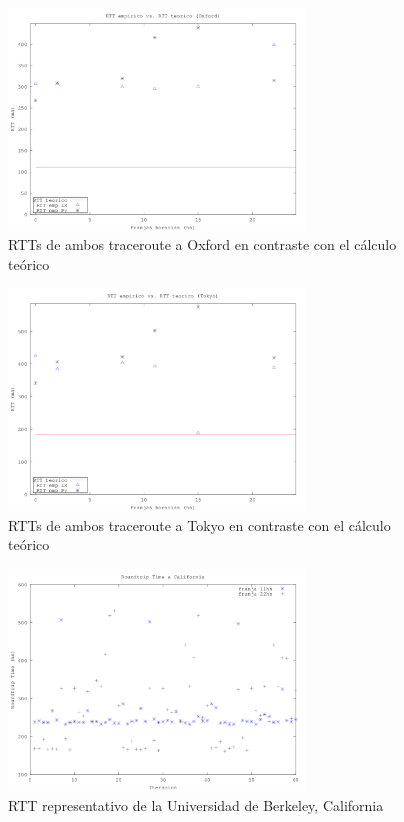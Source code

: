 \begin{figure}[h!]
  \centering
  \includegraphics[width=0.7\textwidth]{./figs/rtt_emp_vs_teo_oxford.png}
  \caption{RTTs de ambos traceroute a Oxford en contraste con el cálculo teórico}
  \label{fig:emp_vs_teo_ox}
\end{figure}

\begin{figure}[h!]
  \centering
  \includegraphics[width=0.7\textwidth]{./figs/rtt_emp_vs_teo_tokyo.png}
  \caption{RTTs de ambos traceroute a Tokyo en contraste con el cálculo teórico}
  \label{fig:emp_vs_teo_berk}
\end{figure}

\begin{figure}[h!]
  \centering
  \includegraphics[width=0.7\textwidth]{./figs/rtt_horarios_california.png}
  \caption{RTT representativo de la Universidad de Berkeley, California}
  \label{fig:rtt-horarios-california}
\end{figure}

